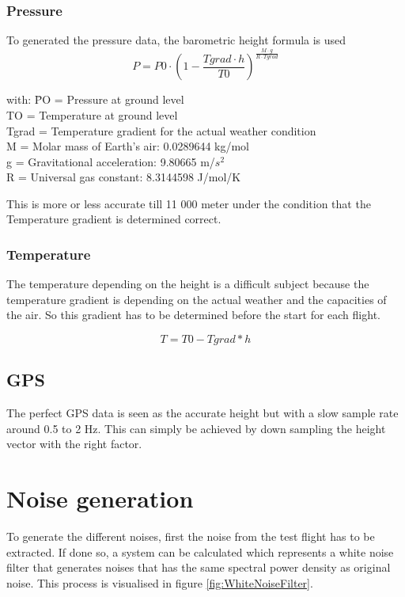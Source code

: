   \subsubsection{Pressure}
  To generated the pressure data, the barometric height formula is used %
  $$P = P0 \cdot (1- \frac{Tgrad\cdot h}{T0})^{\frac{M\cdot g}{R\cdot Tgrad}}$$
  \begin{tabbing}
  with: \= PO = Pressure at ground level \\
  \> TO = Temperature at ground level \\
  \> Tgrad = Temperature gradient for the actual weather condition \\
  \> M = Molar mass of Earth's air: 0.0289644 kg/mol\\
  \> g = Gravitational acceleration: 9.80665 m/$s^2$\\
  \> R = Universal gas constant: 8.3144598 J/mol/K\\
  \end{tabbing}

  This is more or less accurate till 11 000 meter under the condition that the Temperature gradient is determined correct. 

  \subsubsection{Temperature}
  The temperature depending on the height is a difficult subject because the temperature gradient is depending on the actual weather and the capacities of the air.
  So this gradient has to be determined before the start for each flight.

  $$T = T0 - Tgrad*h$$
  
  \subsection{GPS}
  The perfect GPS data is seen as the accurate height but with a slow sample rate around 0.5 to 2 Hz.
  This can simply be achieved by down sampling the height vector with the right factor.
  
  \section{Noise generation}
  To generate the different noises, first the noise from the test flight has to be extracted.
  If done so, a system can be calculated which represents a white noise filter that generates noises
  that has the same spectral power density as original noise. This process is visualised in figure \ref{fig:WhiteNoiseFilter}.
  
